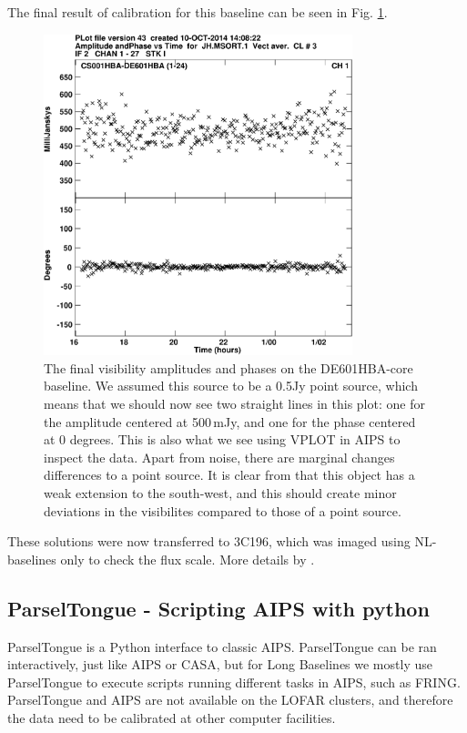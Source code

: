 The final result of calibration for this baseline can be seen in Fig. \ref{fig:vplot}.
\begin{figure}[htbp]
\centering
    \includegraphics[width=0.8\textwidth]{figs/J0958Hvplot-crop.pdf}
\caption{
The final visibility amplitudes and phases on the DE601HBA-core baseline. We
assumed this source to be a 0.5Jy point source, which means that we should now
see two straight lines in this plot: one for the amplitude centered at
500\,mJy, and one for the phase centered at 0 degrees. This is also what we see
using VPLOT in AIPS to inspect the data. Apart from noise, there are marginal
changes differences to a point source. It is clear from \cite{varenius2014}
that this object has a weak extension to the south-west, and this should create
minor deviations in the visibilites compared to those of a point source.
\label{fig:vplot}
}
\end{figure}

These solutions were now transferred to 3C196, which was imaged using NL-baselines only
to check the flux scale. More details by \cite{varenius2014}.

\subsection{ParselTongue - Scripting AIPS with python}
\label{sect:parseltongue}
ParselTongue is a Python interface to classic AIPS. ParselTongue can be ran
interactively, just like AIPS or CASA, but for Long Baselines we mostly use
ParselTongue to execute scripts running different tasks in AIPS, such as FRING.
ParselTongue and AIPS are not available on the LOFAR clusters, and therefore
the data need to be calibrated at other computer facilities. 

